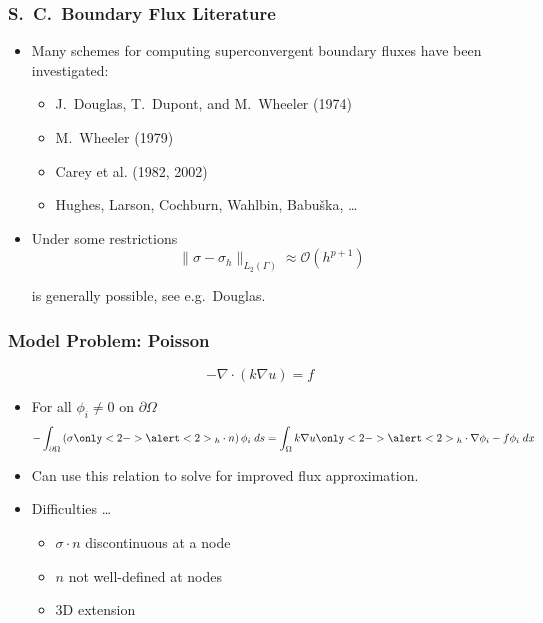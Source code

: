 \documentclass[
  compress
  ,12pt
]{beamer}
\begin{document}
\begin{frame}
  \frametitle{S.~C.~Boundary Flux Literature}
      \begin{itemize}
      \item
	{
          Many schemes for computing superconvergent boundary fluxes have been investigated:

	  \begin{itemize}
	  \item{J.~Douglas, T.~Dupont, and M.~Wheeler (1974)}
	  \item{M.~Wheeler (1979)}
	  \item{Carey et al. (1982, 2002)}
	  \item{Hughes, Larson, Cochburn, Wahlbin, Babu{\v{s}}ka, \ldots}
	  \end{itemize}
	}
	
      \item{Under some restrictions
	\begin{equation}
	  \nonumber
	  \| \sigma - \sigma_h \|_{L_2(\Gamma)} \approx \mathcal{O}(h^{p+1})
	\end{equation}

	is generally possible, see e.g.\ Douglas.}
	
      \end{itemize}
\end{frame}


\begin{frame}
  \frametitle{Model Problem: Poisson}
	\begin{equation}
	  \nonumber
	  -\nabla \cdot \left( k \nabla u \right)=f
	\end{equation}
      \begin{itemize}
      \item<1->{For all $\phi_i \neq 0$ on $\partial \Omega$
      \begin{equation}
	\nonumber
	-\int_{\partial \Omega} \left( \sigma\only<2->{\alert<2>{_h}} \cdot n\right)\phi_i \;ds =
	\int_{\Omega} k\nabla u\only<2->{\alert<2>{_h}} \cdot \nabla \phi_i - f\phi_i \;dx 
	\end{equation}

      }
	
      \item<3->{Can use this relation to solve for improved flux approximation.}

      \item<4->{Difficulties \ldots
	\begin{itemize}
	  \item {$\sigma \cdot n$ discontinuous at a node}
	  \item {$n$ not well-defined at nodes}
	  \item {3D extension}
	\end{itemize}
      }
      \end{itemize}
\end{frame}
\end{document}
